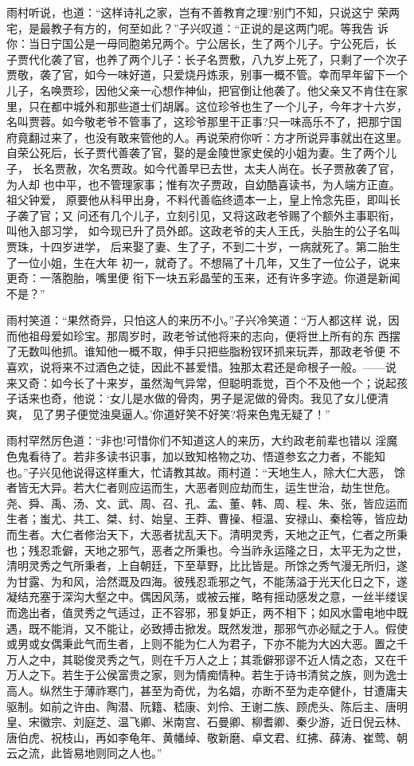 雨村听说，也道：“这样诗礼之家，岂有不善教育之理?别门不知，只说这宁
荣两宅，是最教子有方的，何至如此？”子兴叹道：“正说的是这两门呢。等我告
诉你：当日宁国公是一母同胞弟兄两个。宁公居长，生了两个儿子。宁公死后，长
子贾代化袭了官，也养了两个儿子：长子名贾敷，八九岁上死了，只剩了一个次子
贾敬，袭了官，如今一味好道，只爱烧丹炼汞，别事一概不管。幸而早年留下一个
儿子，名唤贾珍，因他父亲一心想作神仙，把官倒让他袭了。他父亲又不肯住在家
里，只在都中城外和那些道士们胡羼。这位珍爷也生了一个儿子，今年才十六岁，
名叫贾蓉。如今敬老爷不管事了，这珍爷那里干正事?只一味高乐不了，把那宁国
府竟翻过来了，也没有敢来管他的人。再说荣府你听：方才所说异事就出在这里。
自荣公死后，长子贾代善袭了官，娶的是金陵世家史侯的小姐为妻。生了两个儿子，
长名贾赦，次名贾政。如今代善早已去世，太夫人尚在。长子贾赦袭了官，为人却
也中平，也不管理家事；惟有次子贾政，自幼酷喜读书，为人端方正直。祖父钟爱，
原要他从科甲出身，不料代善临终遗本一上，皇上怜念先臣，即叫长子袭了官；又
问还有几个儿子，立刻引见，又将这政老爷赐了个额外主事职衔，叫他入部习学，
如今现已升了员外郎。这政老爷的夫人王氏，头胎生的公子名叫贾珠，十四岁进学，
后来娶了妻、生了子，不到二十岁，一病就死了。第二胎生了一位小姐，生在大年
初一，就奇了。不想隔了十几年，又生了一位公子，说来更奇：一落胞胎，嘴里便
衔下一块五彩晶莹的玉来，还有许多字迹。你道是新闻不是？”

雨村笑道：“果然奇异，只怕这人的来历不小。”子兴冷笑道：“万人都这样
说，因而他祖母爱如珍宝。那周岁时，政老爷试他将来的志向，便将世上所有的东
西摆了无数叫他抓。谁知他一概不取，伸手只把些脂粉钗环抓来玩弄，那政老爷便
不喜欢，说将来不过酒色之徒，因此不甚爱惜。独那太君还是命根子一般。——说
来又奇：如今长了十来岁，虽然淘气异常，但聪明乖觉，百个不及他一个；说起孩
子话来也奇，他说：‘女儿是水做的骨肉，男子是泥做的骨肉。我见了女儿便清爽，
见了男子便觉浊臭逼人。’你道好笑不好笑?将来色鬼无疑了！”

雨村罕然厉色道：“非也!可惜你们不知道这人的来历，大约政老前辈也错以
淫魔色鬼看待了。若非多读书识事，加以致知格物之功、悟道参玄之力者，不能知
也。”子兴见他说得这样重大，忙请教其故。雨村道：“天地生人，除大仁大恶，
馀者皆无大异。若大仁者则应运而生，大恶者则应劫而生，运生世治，劫生世危。
尧、舜、禹、汤、文、武、周、召、孔、孟、董、韩、周、程、朱、张，皆应运而
生者；蚩尤、共工、桀、纣、始皇、王莽、曹操、桓温、安禄山、秦桧等，皆应劫
而生者。大仁者修治天下，大恶者扰乱天下。清明灵秀，天地之正气，仁者之所秉
也；残忍乖僻，天地之邪气，恶者之所秉也。今当祚永运隆之日，太平无为之世，
清明灵秀之气所秉者，上自朝廷，下至草野，比比皆是。所馀之秀气漫无所归，遂
为甘露、为和风，洽然溉及四海。彼残忍乖邪之气，不能荡溢于光天化日之下，遂
凝结充塞于深沟大壑之中。偶因风荡，或被云摧，略有摇动感发之意，一丝半缕误
而逸出者，值灵秀之气适过，正不容邪，邪复妒正，两不相下；如风水雷电地中既
遇，既不能消，又不能让，必致搏击掀发。既然发泄，那邪气亦必赋之于人。假使
或男或女偶秉此气而生者，上则不能为仁人为君子，下亦不能为大凶大恶。置之千
万人之中，其聪俊灵秀之气，则在千万人之上；其乖僻邪谬不近人情之态，又在千
万人之下。若生于公侯富贵之家，则为情痴情种。若生于诗书清贫之族，则为逸士
高人。纵然生于薄祚寒门，甚至为奇优，为名娼，亦断不至为走卒健仆，甘遭庸夫
驱制。如前之许由、陶潜、阮籍、嵇康、刘伶、王谢二族、顾虎头、陈后主、唐明
皇、宋徽宗、刘庭芝、温飞卿、米南宫、石曼卿、柳耆卿、秦少游，近日倪云林、
唐伯虎、祝枝山，再如李龟年、黄幡绰、敬新磨、卓文君、红拂、薛涛、崔莺、朝
云之流，此皆易地则同之人也。”

